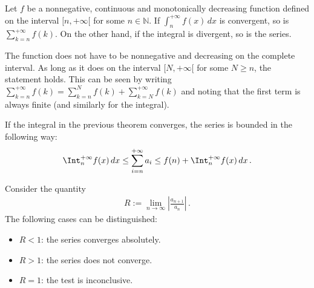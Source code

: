     \begin{method}
        Let $f$ be a nonnegative, continuous and monotonically decreasing function defined on the interval $[n,+\infty[$ for some $n\in\mathbb{N}$. If $\int_n^{+\infty}f(x)\,dx$ is convergent, so is $\sum_{k=n}^{+\infty}f(k)$. On the other hand, if the integral is divergent, so is the series.
    \end{method}
    \begin{remark}
        The function does not have to be nonnegative and decreasing on the complete interval. As long as it does on the interval $[N,+\infty[$ for some $N\geq n$, the statement holds. This can be seen by writing $\sum_{k=n}^{+\infty}f(k) = \sum_{k=n}^Nf(k) + \sum_{k=N}^{+\infty}f(k)$ and noting that the first term is always finite (and similarly for the integral).
    \end{remark}

    \begin{property}
        If the integral in the previous theorem converges, the series is bounded in the following way:
        \begin{gather}
            \Int_n^{+\infty} f(x)\,dx\leq\sum_{i=n}^{+\infty} a_i \leq f(n) + \Int_n^{+\infty} f(x)\,dx\,.
        \end{gather}
    \end{property}

    \begin{method}
        Consider the quantity
        \begin{gather}
            R := \lim_{n\rightarrow\infty}\left|\frac{a_{n+1}}{a_n}\right|\,.
        \end{gather}
        The following cases can be distinguished:
        \begin{itemize}
            \item $R<1$: the series converges absolutely.
            \item $R>1$: the series does not converge.
            \item $R=1$: the test is inconclusive.
        \end{itemize}
    \end{method}

